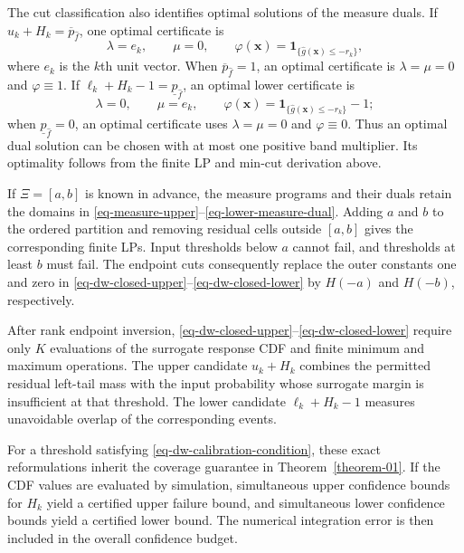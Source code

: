 \documentclass[review,11pt,3p,authoryear,nopreprintline]{elsarticle}
\begin{document}
The cut classification also identifies optimal solutions of the measure duals. If $u_k+H_k=\overline p_{\hat f}$, one optimal certificate is
\[
  \lambda=e_k,\qquad \mu=0,\qquad
  \varphi(\bm x)=\mathbf1_{\{\hat g(\bm x)\le-r_k\}},
\]
where $e_k$ is the $k$th unit vector. When $\overline p_{\hat f}=1$, an optimal certificate is $\lambda=\mu=0$ and $\varphi\equiv1$. If $\ell_k+H_k-1=\underline p_{\hat f}$, an optimal lower certificate is
\[
  \lambda=0,\qquad \mu=e_k,\qquad
  \varphi(\bm x)=\mathbf1_{\{\hat g(\bm x)\le-r_k\}}-1;
\]
when $\underline p_{\hat f}=0$, an optimal certificate uses $\lambda=\mu=0$ and $\varphi\equiv0$. Thus an optimal dual solution can be chosen with at most one positive band multiplier. Its optimality follows from the finite LP and min-cut derivation above.

\begin{remark}
  \label{rem-interval-support}
  If $\Xi=[a,b]$ is known in advance, the measure programs and their duals retain the domains in \eqref{eq-measure-upper}--\eqref{eq-lower-measure-dual}. Adding $a$ and $b$ to the ordered partition and removing residual cells outside $[a,b]$ gives the corresponding finite LPs. Input thresholds below $a$ cannot fail, and thresholds at least $b$ must fail. The endpoint cuts consequently replace the outer constants one and zero in \eqref{eq-dw-closed-upper}--\eqref{eq-dw-closed-lower} by $H(-a)$ and $H(-b)$, respectively.
\end{remark}

After rank endpoint inversion, \eqref{eq-dw-closed-upper}--\eqref{eq-dw-closed-lower} require only $K$ evaluations of the surrogate response CDF and finite minimum and maximum operations. The upper candidate $u_k+H_k$ combines the permitted residual left-tail mass with the input probability whose surrogate margin is insufficient at that threshold. The lower candidate $\ell_k+H_k-1$ measures unavoidable overlap of the corresponding events.

For a threshold satisfying \eqref{eq-dw-calibration-condition}, these exact reformulations inherit the coverage guarantee in Theorem~\ref{theorem-01}. If the CDF values are evaluated by simulation, simultaneous upper confidence bounds for $H_k$ yield a certified upper failure bound, and simultaneous lower confidence bounds yield a certified lower bound. The numerical integration error is then included in the overall confidence budget.



\end{document}
